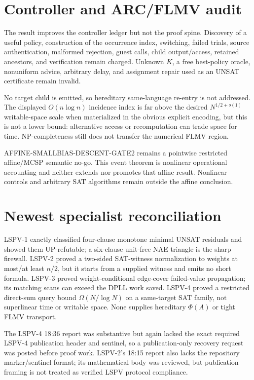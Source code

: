 \documentclass[11pt]{article}
\begin{document}
\section{Controller and ARC/FLMV audit}
The result improves the controller ledger but not the proof spine.  Discovery of a useful policy, construction of the occurrence index, switching, failed trials, source authentication, malformed rejection, guest calls, child output/access, retained ancestors, and verification remain charged.  Unknown $K$, a free best-policy oracle, nonuniform advice, arbitrary delay, and assignment repair used as an UNSAT certificate remain invalid.

No target child is emitted, so hereditary same-language re-entry is not addressed.  The displayed $O(n\log n)$ incidence index is far above the desired $N^{1/2+o(1)}$ writable-space scale when materialized in the obvious explicit encoding, but this is not a lower bound: alternative access or recomputation can trade space for time.  NP-completeness still does not transfer the numerical FLMV region.

AFFINE-SMALLBIAS-DESCENT-GATE2 remains a pointwise restricted affine/MCSP semantic no-go.  This event theorem is nonlinear operational accounting and neither extends nor promotes that affine result.  Nonlinear controls and arbitrary SAT algorithms remain outside the affine conclusion.

\section{Newest specialist reconciliation}
LSPV-1 exactly classified four-clause monotone minimal UNSAT residuals and showed them UP-refutable; a six-clause unit-free NAE triangle is the sharp firewall.  LSPV-2 proved a two-sided SAT-witness normalization to weights at most/at least $n/2$, but it starts from a supplied witness and emits no short formula.  LSPV-3 proved weight-conditional edge-cover failed-value propagation; its matching scans can exceed the DPLL work saved.  LSPV-4 proved a restricted direct-sum query bound $\Omega(N/\log N)$ on a same-target SAT family, not superlinear time or writable space.  None supplies hereditary $\Phi(A)$ or tight FLMV transport.

The LSPV-4 18:36 report was substantive but again lacked the exact required LSPV-4 publication header and sentinel, so a publication-only recovery request was posted before proof work.  LSPV-2's 18:15 report also lacks the repository marker/sentinel format; its mathematical body was reviewed, but publication framing is not treated as verified LSPV protocol compliance.
\end{document}
